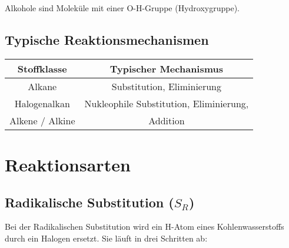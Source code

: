 \documentclass[a4paper]{article}
\begin{document}
Alkohole sind Moleküle mit einer O-H-Gruppe (Hydroxygruppe).


\subsection{Typische Reaktionsmechanismen}
\begin{tabular}{|c|c|} \hline
    Stoffklasse &Typischer Mechanismus \\\hline
    Alkane &Substitution, Eliminierung\\
    Halogenalkan &Nukleophile Substitution, Eliminierung,\\
    Alkene / Alkine &Addition\\\hline
\end{tabular}



\newpage
\section{Reaktionsarten}

\subsection{Radikalische Substitution ($S_R$)}

Bei der Radikalischen Substitution wird ein H-Atom eines Kohlenwasserstoffs durch ein Halogen ersetzt.
Sie läuft in drei Schritten ab:\\
\end{document}
